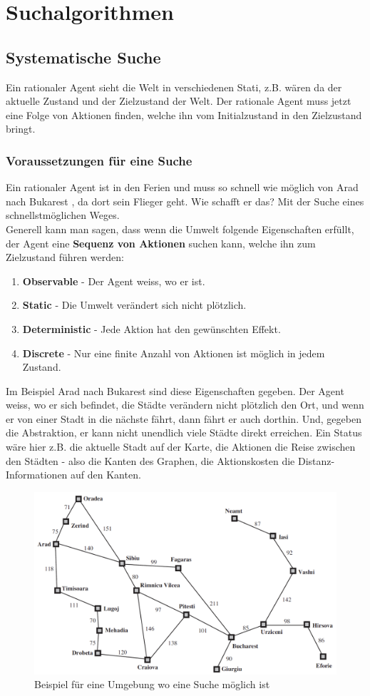 \chapter{Suchalgorithmen}
\section{Systematische Suche}
Ein rationaler Agent sieht die Welt in verschiedenen Stati, z.B. wären da der aktuelle Zustand und der Zielzustand der Welt. Der rationale Agent muss jetzt eine Folge von Aktionen finden, welche ihn vom Initialzustand in den Zielzustand bringt.
\subsection{Voraussetzungen für eine Suche}
Ein rationaler Agent ist in den Ferien und muss so schnell wie möglich von Arad nach Bukarest , da dort sein Flieger geht. Wie schafft er das? Mit der Suche eines schnellstmöglichen Weges. \\ \newline
Generell kann man sagen, dass wenn die Umwelt folgende Eigenschaften erfüllt, der Agent eine \textbf{Sequenz von Aktionen} suchen kann, welche ihn zum Zielzustand führen werden:

\begin{enumerate}
	\item \textbf{Observable} - Der Agent weiss, wo er ist.
	\item \textbf{Static} - Die Umwelt verändert sich nicht plötzlich.
	\item \textbf{Deterministic} - Jede Aktion hat den gewünschten Effekt.
	\item \textbf{Discrete} - Nur eine finite Anzahl von Aktionen ist möglich in jedem Zustand.
\end{enumerate}

Im Beispiel Arad nach Bukarest sind diese Eigenschaften gegeben. Der Agent weiss, wo er sich befindet, die Städte verändern nicht plötzlich den Ort, und wenn er von einer Stadt in die nächste fährt, dann fährt er auch dorthin. Und, gegeben die Abstraktion, er kann nicht unendlich viele Städte direkt erreichen. Ein Status wäre hier z.B. die aktuelle Stadt auf der Karte, die Aktionen die Reise zwischen den Städten - also die Kanten des Graphen, die Aktionskosten die Distanz-Informationen auf den Kanten. 

\begin{figure}[h]
\centering
\includegraphics[width=0.5\linewidth]{fig/travel_example}
\caption{Beispiel für eine Umgebung wo eine Suche möglich ist}
\label{fig:travel_example}
\end{figure}


